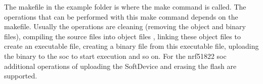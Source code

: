 The makefile in the example folder is where the make command is called. The operations that can be performed with this make command depends on the makefile. Usually the operations are cleaning (removing the object and binary files), compiling the source files into object files , linking these object files to create an executable file, creating a binary file from this executable file, uploading the binary to the \gls{soc} to start execution and so on. For the nrf51822 \gls{soc} additional operations of uploading the SoftDevice and erasing the flash are supported.

